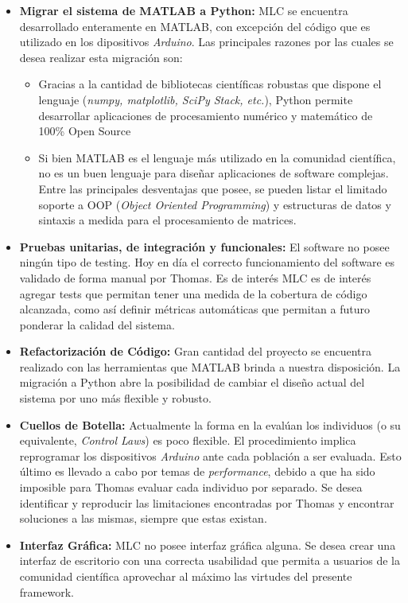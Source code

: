 \documentclass[a4paper,10pt]{article}
\begin{document}
        \begin{itemize}
            \item \textbf{Migrar el sistema de MATLAB a Python:} MLC se encuentra desarrollado enteramente en MATLAB, con excepción del
            código que es utilizado en los dipositivos \textit{Arduino}. Las principales razones por las cuales se desea realizar esta
            migración son:
            \begin{itemize}
                \item Gracias a la cantidad de bibliotecas científicas robustas que dispone el lenguaje (\textit{numpy, matplotlib,
                SciPy Stack, etc.}), Python permite desarrollar aplicaciones de procesamiento numérico y matemático de 100\% Open
                Source
                \item Si bien MATLAB es el lenguaje más utilizado en la comunidad científica, no es un buen
                lenguaje para diseñar aplicaciones de software complejas. Entre las principales desventajas que posee, se pueden listar
                el limitado soporte a OOP (\textit{Object Oriented Programming}) y estructuras de datos y sintaxis a medida para el
                procesamiento de matrices.
            \end{itemize}

            \item \textbf{Pruebas unitarias, de integración y funcionales:} El software no posee ningún tipo de testing. Hoy en día el
            correcto funcionamiento del software es validado de forma manual por Thomas. Es de interés
            MLC es de interés agregar tests que permitan tener una medida de la cobertura de código alcanzada, como así definir métricas
            automáticas que permitan a futuro ponderar la calidad del sistema.
            \item \textbf{Refactorización de Código:} Gran cantidad del proyecto se encuentra realizado con las herramientas que MATLAB
            brinda a nuestra disposición. La migración a Python abre la posibilidad de cambiar el diseño actual del sistema por uno más
            flexible y robusto. 
            \item \textbf{Cuellos de Botella:} Actualmente la forma en la evalúan los individuos (o su equivalente, \textit{Control Laws})
            es poco flexible. El procedimiento implica reprogramar los dispositivos \textit{Arduino} ante cada población a ser evaluada.
            Esto último es llevado a cabo por temas de \textit{performance}, debido a que ha sido imposible para Thomas evaluar cada 
            individuo por separado. Se desea identificar y reproducir las limitaciones encontradas por Thomas y encontrar soluciones a
            las mismas, siempre que estas existan. 
            \item \textbf{Interfaz Gráfica:} MLC no posee interfaz gráfica alguna. Se desea crear una interfaz de escritorio
            con una correcta usabilidad que permita a usuarios de la comunidad científica aprovechar al máximo las virtudes del presente
            framework.
        \end{itemize}
\end{document}
